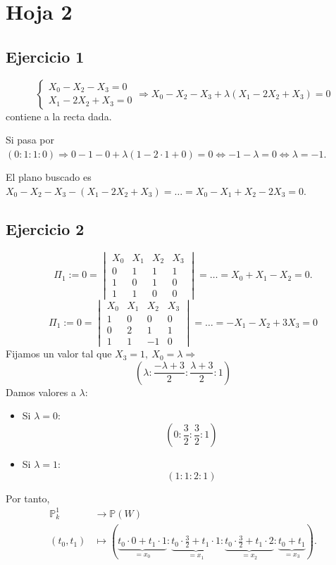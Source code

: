 \documentclass[10pt,a4paper,openright]{book}
\theoremstyle{break}
\begin{document}
\chapter{Hoja 2}%
\label{cha:hoja_2}
\section{Ejercicio 1}%
\label{sec:ejercicio_1}
\[
\begin{cases}
    X_0 - X_2 - X_3 = 0\\
    X_1 - 2X_2 + X_3 = 0
\end{cases} \Rightarrow X_0 - X_2 - X_3 + \lambda\left( X_1 - 2X_2 + X_3 \right) = 0
\]
contiene a la recta dada.

Si pasa por $\left( 0 : 1 : 1 : 0 \right) \Rightarrow 0 - 1 - 0 + \lambda\left( 1 - 2 \cdot 1 + 0 \right) = 0 \Leftrightarrow -1 - \lambda = 0 \Leftrightarrow \lambda = -1$.

El plano buscado es $X_0 - X_2 - X_3 - \left( X_1 - 2X_2 + X_3 \right) = \ldots = X_0 - X_1 + X_2 - 2X_3 = 0$.

\section{Ejercicio 2}%
\label{sec:ejercicio_2}
\[
    \Pi_1 := 0 = \begin{vmatrix} X_0 & X_1 & X_2 & X_3\\ 0 & 1 & 1 & 1\\ 1 & 0 & 1 & 0\\ 1 & 1 & 0 & 0 \end{vmatrix} = \ldots = X_0 + X_1 - X_2 = 0.
\]\[
    \Pi_1 := 0 = \begin{vmatrix} X_0 & X_1 & X_2 & X_3\\ 1 & 0 & 0 & 0\\ 0 & 2 & 1 & 1\\ 1 & 1 & -1 & 0 \end{vmatrix} = \ldots = -X_1 - X_2 + 3X_3 = 0
\]
Fijamos un valor tal que $X_3 = 1,\ X_0 = \lambda \Rightarrow$
\[
\left( \lambda : \frac{-\lambda + 3}{2} : \frac{\lambda + 3}{2} : 1 \right) 
\]
Damos valores a $\lambda$:
\begin{itemize}
    \item Si $\lambda = 0$: 
    \[
    \left( 0 : \frac{3}{2} : \frac{3}{2} : 1 \right)  
    \]
    \item Si $\lambda = 1$: 
    \[
    \left( 1 : 1 : 2 : 1 \right) 
    \]
\end{itemize}
Por tanto,
\begin{align*}
    \mathbb{P}^{1}_{k} &\rightarrow \mathbb{P} \left( W \right)\\
    \left( t_0, t_1 \right) &\mapsto \left( \underbrace{t_0 \cdot 0 + t_1\cdot 1}_{= x_0}  : \underbrace{t_0 \cdot \frac{3}{2} + t_1 \cdot 1}_{= x_1}  : \underbrace{t_0 \cdot \frac{3}{2} + t_1 \cdot 2}_{= x_2}  : \underbrace{t_0 + t_1}_{= x_3} \right)
.\end{align*}
\end{document}
